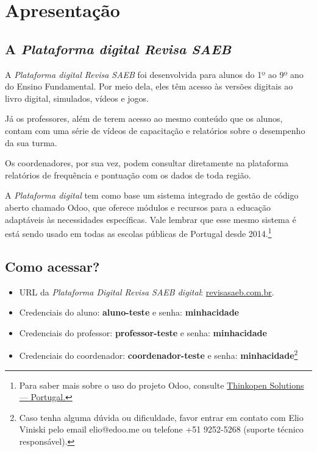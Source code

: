 \captionsetup{justification=raggedright, singlelinecheck=false}

\chapter{Apresentação}

\section{A \textit{Plataforma digital Revisa SAEB}}


A \textit{Plataforma digital Revisa SAEB} foi desenvolvida para alunos 
do 1º ao 9º ano do Ensino Fundamental. Por meio dela, eles
têm acesso às versões digitais ao livro digital, simulados, vídeos e jogos. 

Já os professores, além de terem acesso ao
mesmo conteúdo que os alunos, contam com uma série de vídeos de capacitação 
e  relatórios sobre o desempenho da sua turma.

Os coordenadores, por sua vez, podem consultar  diretamente na plataforma relatórios de frequência e pontuação
com os dados de toda região.


A \textit{Plataforma digital} tem como base um
sistema integrado de gestão de código aberto chamado Odoo, 
que oferece  módulos e recursos para a educação adaptáveis às
necessidades específicas. Vale lembrar que esse mesmo sistema é está sendo usado
em todas as escolas públicas de Portugal desde 2014.\footnote{ Para saber mais sobre o uso do projeto Odoo, consulte 
\href{https://www.odoo.com/pt_BR/partners/thinkopen-solutions-portugal-2614}{Thinkopen Solutions — Portugal.}}




\section{Como acessar?} 

\begin{itemize}
\item URL da \textit{Plataforma Digital Revisa SAEB digital}:  \url{revisasaeb.com.br}.

\item Credenciais do aluno: \textbf{aluno-teste} e senha: \textbf{minhacidade}
\item Credenciais do professor: \textbf{professor-teste} e senha: \textbf{minhacidade}
\item Credenciais do coordenador: \textbf{coordenador-teste} e senha: \textbf
 {minhacidade}\footnote{ Caso tenha alguma dúvida ou dificuldade, favor
 entrar em contato com Elio Viniski pelo email elio@edoo.me ou
 telefone +51 9252-5268 (suporte técnico responsável). }
\end{itemize}

